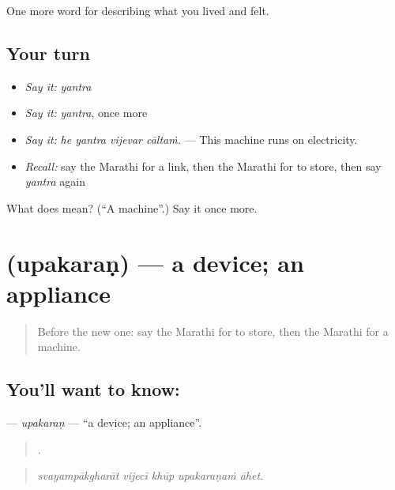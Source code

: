 \begin{grammarlens}[title={What you've built}]
One more word for describing what you lived and felt.
\end{grammarlens}

\subsection*{Your turn}
\begin{itemize}
\raggedright
  \item \emph{Say it:} \emph{yantra}
  \item \emph{Say it:} \emph{yantra}, once more
  \item \emph{Say it:} \emph{he yantra vijevar cāltaṁ.} — This machine runs on electricity.
  \item \emph{Recall:} say the Marathi for a link, then the Marathi for to store, then say \emph{yantra} again
\end{itemize}

\begin{tcolorbox}[breakable,colback=teal!4,colframe=teal!35!black,title={Before you move on}]
What does  mean? (\textquotedblleft{}A machine\textquotedblright{}.) Say it once more.
\end{tcolorbox}
\section[\texorpdfstring{\mr{उपकरण} (upakaraṇ)}{उपकरण (upakaraṇ)}]{ (upakaraṇ) — a device; an appliance}

\label{lesson:MR-C518-upakaran}



\begin{quote}
Before the new one: say the Marathi for to store, then the Marathi for a machine.
\end{quote}

\subsection*{You'll want to know: }
\textbf{} — \emph{upakaraṇ} — \textquotedblleft{}a device; an appliance\textquotedblright{}.

\begin{quote}
    .
\end{quote}

\begin{quote}
\emph{svayampākgharāt vijecī khūp upakaraṇaṁ āhet.}
\end{quote}

